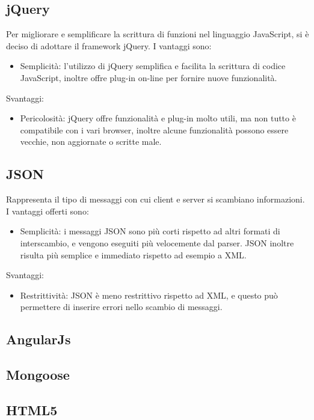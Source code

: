 \subsection{jQuery}
Per migliorare e semplificare la scrittura di funzioni nel linguaggio JavaScript, si è deciso di adottare il framework jQuery. I vantaggi sono:
\begin{itemize}
\item Semplicità: l'utilizzo di jQuery semplifica e facilita la scrittura di codice JavaScript, inoltre offre plug-in on-line per fornire nuove funzionalità.
\end{itemize}
Svantaggi:
\begin{itemize}
\item Pericolosità: jQuery offre funzionalità e plug-in molto utili, ma non tutto è compatibile con i vari browser, inoltre alcune funzionalità possono essere vecchie, non aggiornate o scritte male.
\end{itemize}

\subsection{JSON}
Rappresenta il tipo di messaggi con cui client e server si scambiano informazioni. I vantaggi offerti sono:
\begin{itemize}
\item Semplicità: i messaggi JSON sono più corti rispetto ad altri formati di interscambio, e vengono eseguiti più velocemente dal parser. JSON inoltre risulta più semplice e immediato rispetto ad esempio a XML.
\end{itemize}
Svantaggi:
\begin{itemize}
\item Restrittività: JSON è meno restrittivo rispetto ad XML, e questo può permettere di inserire errori nello scambio di messaggi.
\end{itemize}

\subsection{AngularJs}

\subsection{Mongoose}

\subsection{HTML5}

